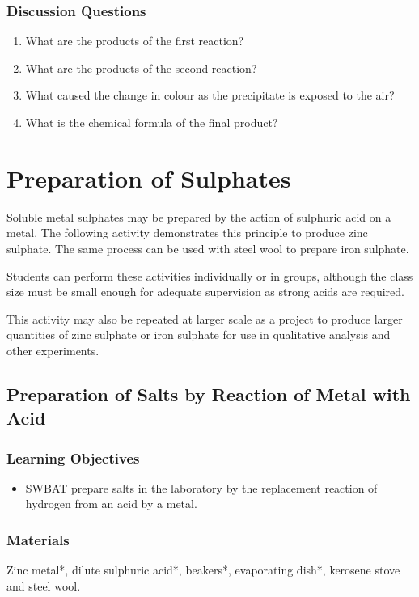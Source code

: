 \subsubsection*{Discussion Questions}
\begin{enumerate}
\item{What are the products of the first reaction?}
\item{What are the products of the second reaction?}
\item{What caused the change in colour as the precipitate is exposed to the air?}
\item{What is the chemical formula of the final product?}
\end{enumerate}

\section{Preparation of Sulphates}

Soluble metal sulphates may be prepared by the action of sulphuric acid on a metal. The following activity demonstrates this principle to produce zinc sulphate. The same process can be used with steel wool to prepare iron sulphate.

Students can perform these activities individually or in groups, although the class size must be small enough for adequate supervision as strong acids are required.

This activity may also be repeated at larger scale as a project to produce larger quantities of zinc sulphate or iron sulphate for use in qualitative analysis and other experiments.

\subsection{Preparation of Salts by Reaction of Metal with Acid}

\subsubsection*{Learning Objectives}
\begin{itemize}
\item{SWBAT prepare salts in the laboratory by the replacement reaction of hydrogen from an acid by a metal.}
\end{itemize}

\subsubsection*{Materials}
Zinc metal*, dilute sulphuric acid*, beakers*, evaporating dish*, kerosene stove and steel wool.

